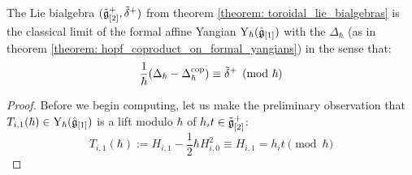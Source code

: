         \begin{theorem} \label{theorem: toroidal_lie_algebras_as_classical_limits_of_formal_affine_yangians}
           The Lie bialgebra $(\tilde{\mathfrak{g}}_{[2]}^+, \tilde{\delta}^+)$ from theorem \ref{theorem: toroidal_lie_bialgebras} is the classical limit of the formal affine Yangian $\mathrm{Y}_{\hbar}(\hat{\mathfrak{g}}_{[1]})$ with the  $\Delta_{\hbar}$ (as in theorem \ref{theorem: hopf_coproduct_on_formal_yangians}) in the sense that:
                $$\frac{1}{\hbar}( \Delta_{\hbar} - \Delta_{\hbar}^{\mathrm{cop}} ) \equiv \tilde{\delta}^+ \pmod{\hbar}$$
        \end{theorem}
            \begin{proof}
                Before we begin computing, let us make the preliminary observation that $T_{i, 1}(\hbar) \in \mathrm{Y}_{\hbar}(\hat{\mathfrak{g}}_{[1]})$ is a lift modulo $\hbar$ of $h_i t \in \tilde{\mathfrak{g}}_{[2]}^+$:
                    $$T_{i, 1}(\hbar) := H_{i, 1} - \frac12 \hbar H_{i, 0}^2 \equiv H_{i, 1} = h_i t \pmod{\hbar}$$
            

\end{proof}
